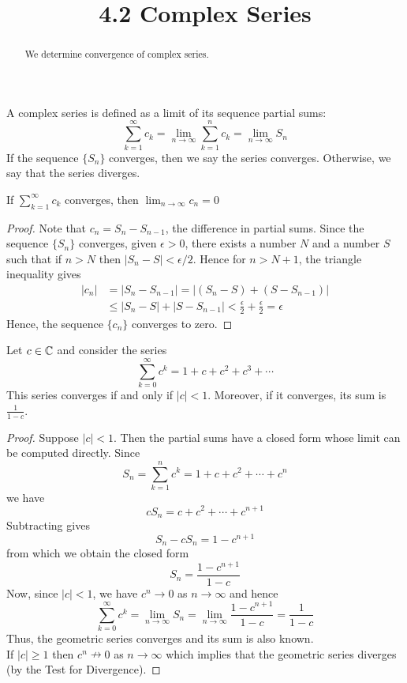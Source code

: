 \documentclass[handout]{ximera}
\title{4.2 Complex Series}
\begin{document}
\begin{abstract}
We determine convergence of complex series.
\end{abstract}

\maketitle


\begin{definition} 
A complex series  is defined as a limit of its sequence partial sums:
\[
\sum_{k=1}^\infty c_k = \lim_{n \to \infty}  \sum_{k=1}^n c_k = \lim_{n \to \infty} S_n
\]
If the sequence $\{S_n\}$ converges, then we say the series converges.  Otherwise, we say that the series diverges. 
\end{definition}

\begin{theorem}
If $\displaystyle \sum_{k=1}^\infty c_k$ converges, then $\displaystyle \lim_{n\to\infty} c_n = 0$
\end{theorem}
\begin{proof}
Note that $c_n = S_n - S_{n-1}$, the difference in partial sums. Since the sequence $\{S_n\}$ converges, given $\epsilon >0$,
there exists a number $N$ and a number $S$ such that if $n>N$ then $|S_n - S| < \epsilon/2$. Hence for $n > N+1$, the triangle inequality gives
\begin{align*}
|c_n| &= |S_n - S_{n-1}| = |(S_n -S) + (S-S_{n-1})| \\
&\leq |S_n -S| + |S-S_{n-1}| < \frac{\epsilon}{2} + \frac{\epsilon}{2} =\epsilon
\end{align*}
Hence, the sequence $\{c_n\}$ converges to zero.
\end{proof}

\begin{theorem}
Let $c \in \mathbb C$ and consider the series
\[
\sum_{k=0}^\infty c^k = 1 + c + c^2 + c^3 + \cdots
\]
This series converges if and only if $|c| < 1$.  Moreover, if it converges, its sum is 
$\displaystyle \frac{1}{1-c}$.
\end{theorem}
\begin{proof}
Suppose $|c| < 1$. Then the partial sums have a closed form whose limit can be computed directly.
Since
\[
S_n = \sum_{k=1}^n c^k = 1+c+c^2+\cdots + c^n
\]
we have
\[
cS_n = c+c^2+\cdots + c^{n+1}
\]
Subtracting gives
\[
S_n - cS_n = 1-c^{n+1}
\]
from which we obtain the closed form
\[
S_n = \frac{1-c^{n+1}}{1-c}
\]
Now, since $|c|<1$, we have $c^n \to 0$ as $n \to \infty$ and hence
\[
\sum_{k=0}^\infty c^k = \lim_{n\to \infty} S_n = \lim_{n\to \infty} \frac{1-c^{n+1}}{1-c} = \frac{1}{1-c}
\]
Thus, the geometric series converges and its sum is also known.\\
If $|c| \geq 1$ then $c^n \nrightarrow 0$ as $n \to \infty$ which implies 
that the geometric series diverges (by the Test for Divergence).
\end{proof}
\end{document}

